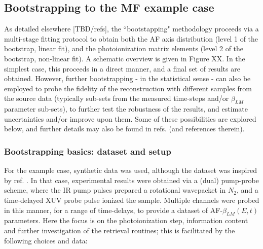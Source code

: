 \subsection{Bootstrapping to the MF example case}

As detailed elsewhere [TBD/refs], the ``bootstapping" methodology proceeds via a multi-stage fitting protocol to obtain both the AF axis distribution (level 1 of the bootstrap, linear fit), and the photoionization matrix elements (level 2 of the bootstrap, non-linear fit). A schematic overview is given in Figure XX. In the simplest case, this proceeds in a direct manner, and a final set of results are obtained. However, further bootstrapping - in the statistical sense - can also be employed to probe the fidelity of the reconstruction with different samples from the source data (typically sub-sets from the measured time-steps and/or $\beta_{LM}$ parameter sub-sets), to further test the robustness of the results, and estimate uncertainties and/or improve upon them. Some of these possibilities are explored below, and further details may also be found in refs. \cite{hockett2018QMP1,hockett2018QMP2,marceau2017MolecularFrameReconstruction} (and references therein).


\subsubsection{Bootstrapping basics: dataset and setup}

For the example case, synthetic data was used, although the dataset was inspired by ref. \cite{marceau2017MolecularFrameReconstruction}. In that case, experimental results were obtained via a (dual) pump-probe scheme, where the IR pump pulses prepared a rotational wavepacket in $N_2$, and a time-delayed XUV probe pulse ionized the sample. Multiple channels were probed in this manner, for a range of time-delays, to provide a dataset of AF-$\beta_{LM}(E,t)$ parameters. Here the focus is on the photoionization step, information content and further investigation of the retrieval routines; this is facilitated by the following choices and data:

